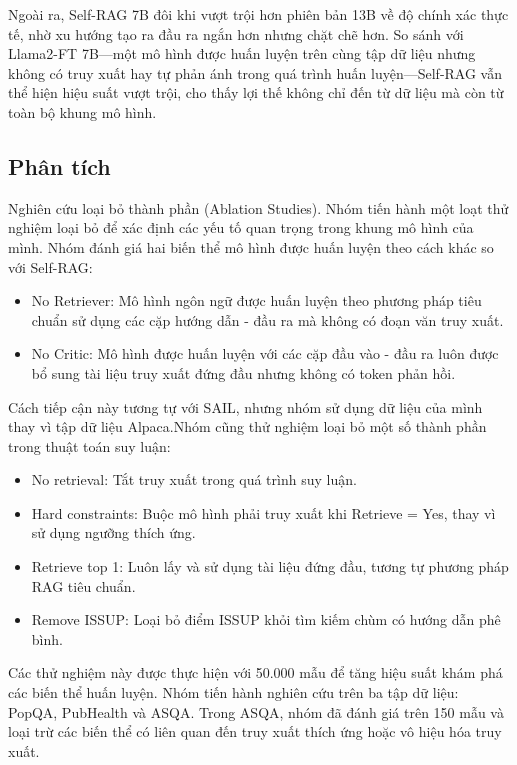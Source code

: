 \documentclass{article}
\begin{document}
Ngoài ra, Self-RAG 7B đôi khi vượt trội hơn phiên bản 13B về độ chính xác thực tế, nhờ xu hướng tạo ra đầu ra ngắn hơn nhưng chặt chẽ hơn. So sánh với Llama2-FT 7B—một mô hình được huấn luyện trên cùng tập dữ liệu nhưng không có truy xuất hay tự phản ánh trong quá trình huấn luyện—Self-RAG vẫn thể hiện hiệu suất vượt trội, cho thấy lợi thế không chỉ đến từ dữ liệu mà còn từ toàn bộ khung mô hình.

\subsection{Phân tích}
Nghiên cứu loại bỏ thành phần (Ablation Studies). Nhóm tiến hành một loạt thử nghiệm loại bỏ để xác định các yếu tố quan trọng trong khung mô hình của mình. Nhóm đánh giá hai biến thể mô hình được huấn luyện theo cách khác so với Self-RAG:

\begin{itemize}
    \item No Retriever: Mô hình ngôn ngữ được huấn luyện theo phương pháp tiêu chuẩn sử dụng các cặp hướng dẫn - đầu ra mà không có đoạn văn truy xuất.
    \item No Critic: Mô hình được huấn luyện với các cặp đầu vào - đầu ra luôn được bổ sung tài liệu truy xuất đứng đầu nhưng không có token phản hồi.
\end{itemize}

Cách tiếp cận này tương tự với SAIL, nhưng nhóm sử dụng dữ liệu của mình thay vì tập dữ liệu Alpaca.Nhóm cũng thử nghiệm loại bỏ một số thành phần trong thuật toán suy luận:

\begin{itemize}
    \item No retrieval: Tắt truy xuất trong quá trình suy luận.
    \item Hard constraints: Buộc mô hình phải truy xuất khi Retrieve = Yes, thay vì sử dụng ngưỡng thích ứng.
    \item Retrieve top 1: Luôn lấy và sử dụng tài liệu đứng đầu, tương tự phương pháp RAG tiêu chuẩn.
    \item Remove ISSUP: Loại bỏ điểm ISSUP khỏi tìm kiếm chùm có hướng dẫn phê bình.
\end{itemize}

Các thử nghiệm này được thực hiện với 50.000 mẫu để tăng hiệu suất khám phá các biến thể huấn luyện. Nhóm tiến hành nghiên cứu trên ba tập dữ liệu: PopQA, PubHealth và ASQA. Trong ASQA, nhóm đã đánh giá trên 150 mẫu và loại trừ các biến thể có liên quan đến truy xuất thích ứng hoặc vô hiệu hóa truy xuất.
\end{document}
